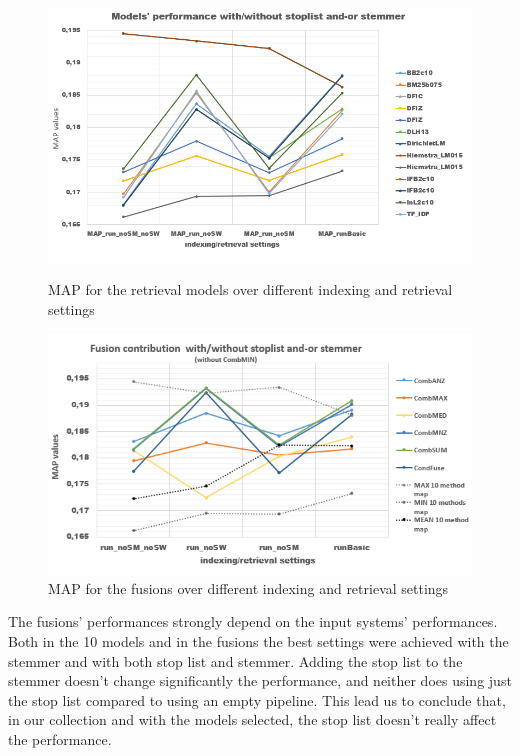 {	\begin{figure}[H]
		\begin{minipage}{0.5\linewidth}
			\centering
			\includegraphics[width=\linewidth]{../eval/results-img-graphs/MAPModSMSW.png}
			\caption{MAP for the retrieval models over different indexing and retrieval settings}				
			\label{fig:MAPMod}
		\end{minipage}
		\begin{minipage}{0.5\linewidth}
			\centering
			\includegraphics[width=\linewidth]{../eval/results-img-graphs/MAPFusSMSW.png}
			\caption{MAP for the fusions over different indexing and retrieval settings}				
			\label{fig:MAPFus}
		\end{minipage}
	\end{figure}

	The fusions' performances strongly depend on the input systems' performances. Both in the 10 models and in the fusions the best settings were achieved with the stemmer and with both stop list and stemmer.
	Adding the stop list to the stemmer doesn't change significantly the performance, and neither does using just the stop list compared to using an empty pipeline.
	This lead us to conclude that, in our collection and with the models selected, the stop list doesn't really affect the performance.
	
}
